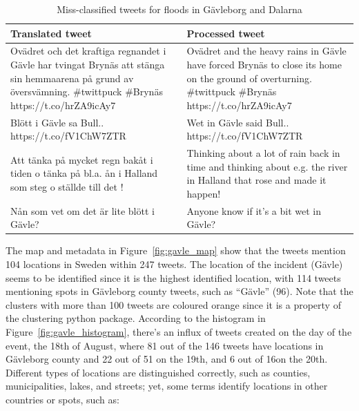 \begin{table}[H]
  \center
  \caption{Miss-classified tweets for floods in Gävleborg and Dalarna}
  \begin{tabular}{|L{7.5cm}|L{7.5cm}|}
    \hline
    Translated tweet & Processed tweet\\
    \hline
    Ovädret och det kraftiga regnandet i Gävle har tvingat Brynäs att stänga sin hemmaarena på grund av
    översvämning. \#twittpuck \#Brynäs https://t.co/hrZA9icAy7 &
    Ovädret and the heavy rains in Gävle have forced Brynäs to close its home on the ground of
    overturning. \#twittpuck \#Brynäs https://t.co/hrZA9icAy7 \\
    \hline
    Blött i Gävle sa Bull.. https://t.co/fV1ChW7ZTR &
    Wet in Gävle said Bull.. https://t.co/fV1ChW7ZTR \\
    \hline
    Att tänka på mycket regn bakåt i tiden o tänka på bl.a. ån i Halland som steg o ställde till det !&
    Thinking about a lot of rain back in time and thinking about e.g. the river in Halland that rose and
    made it happen! \\
    \hline
    Nån som vet om det är lite blött i Gävle?&
    Anyone know if it's a bit wet in Gävle? \\
    \hline
  \end{tabular}
  \label{tab:tweets_missclassified_gavle}
\end{table}

The map and metadata in Figure~\ref{fig:gavle_map} show that the tweets mention 104 locations in
Sweden within 247 tweets. The location of the incident (Gävle) seems to be identified since it is
the highest identified location, with 114 tweets mentioning spots in Gävleborg county tweets, such
as ``Gävle'' (96). Note that the clusters with more than 100 tweets are coloured orange since it is
a property of the clustering python package. According to the histogram in
Figure~\ref{fig:gavle_histogram}, there's an influx of tweets created on the day of the event, the
18th of August, where 81 out of the 146 tweets have locations in Gävleborg county and 22 out of 51
on the 19th, and 6 out of 16on the 20th. Different types of locations are distinguished correctly,
such as counties, municipalities, lakes, and streets; yet, some terms identify locations in other
countries or spots, such as:


